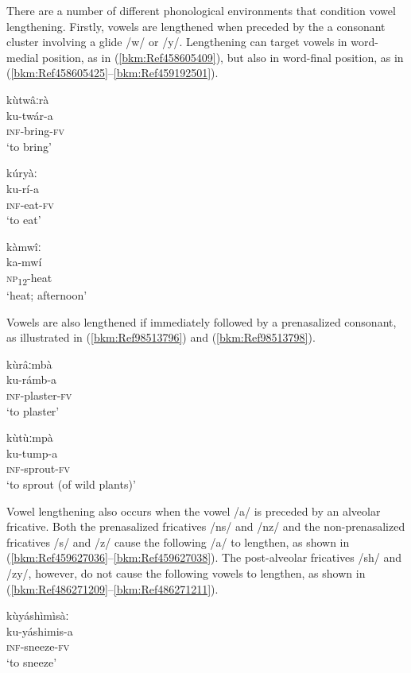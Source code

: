 There are a number of different phonological environments that condition vowel lengthening. Firstly, vowels are lengthened when preceded by the a consonant cluster involving a glide /w/ or /y/. Lengthening can target vowels in word-medial position, as in (\ref{bkm:Ref458605409}), but also in word-final position, as in (\ref{bkm:Ref458605425}--\ref{bkm:Ref459192501}).

\ea
\label{bkm:Ref458605409}
\glll kùtwâːrà\\
ku-twár-a\\
\textsc{inf}-bring-\textsc{fv}\\
\glt ‘to bring’
\z

\ea
\label{bkm:Ref458605425}
\glll kúryàː\\
ku-rí-a\\
\textsc{inf}-eat-\textsc{fv}\\
\glt ‘to eat’
\z

\ea
\label{bkm:Ref459192501}
\glll kàmwîː\\
ka-mwí\\
\textsc{np}\textsubscript{12}-heat\\
\glt ‘heat; afternoon’
\z

Vowels are also lengthened if immediately followed by a prenasalized consonant, as illustrated in (\ref{bkm:Ref98513796}) and (\ref{bkm:Ref98513798}).

\ea
\label{bkm:Ref98513796}
\glll kùrâːmbà\\
ku-rámb-a\\
\textsc{inf}-plaster-\textsc{fv}\\
\glt ‘to plaster’
\z

\ea
\label{bkm:Ref98513798}
\glll kùtùːmpà\\
ku-tump-a\\
\textsc{inf}-sprout-\textsc{fv}\\
\glt ‘to sprout (of wild plants)’
\z

Vowel lengthening also occurs when the vowel /a/ is preceded by an alveolar fricative. Both the prenasalized fricatives /ns/ and /nz/ and the non-prenasalized fricatives /s/ and /z/ cause the follow\-ing /a/ to lengthen, as shown in (\ref{bkm:Ref459627036}--\ref{bkm:Ref459627038}). The post-alveolar fricatives /sh/ and /zy/, however, do not cause the following vowels to lengthen, as shown in (\ref{bkm:Ref486271209}--\ref{bkm:Ref486271211}).

\ea
\label{bkm:Ref459627036}
\glll kùyáshìmìsàː\\
ku-yáshimis-a\\
\textsc{inf}-sneeze-\textsc{fv}\\
\glt ‘to sneeze’
\z

